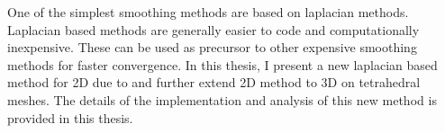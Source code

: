One of the simplest smoothing methods are based on laplacian methods. Laplacian based methods are generally easier to code and computationally inexpensive. These can be used as precursor to other expensive smoothing methods for faster convergence.
In this thesis, I present a new laplacian based method for 2D due to %
and further extend 2D method to 3D on tetrahedral meshes. The details of the implementation and analysis of this new method is provided in this thesis.


